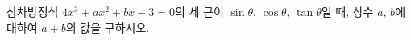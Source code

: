 삼차방정식 $4x^3+ax^2+bx-3=0$의 세 근이 $\sin\theta$, $\cos\theta$, $\tan\theta$일 때, 상수 $a$, $b$에 대하여 $a+b$의 값을 구하시오. 
